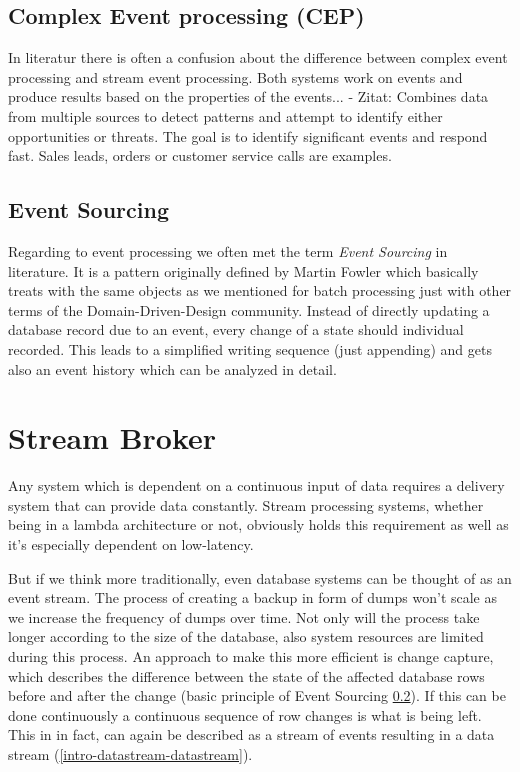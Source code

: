 \subsection{Complex Event processing (CEP)}
In literatur there is often a confusion about the difference between
complex event processing and stream event processing. Both systems work on
events and produce results based on the properties of the events... 
- Zitat: Combines data from multiple sources  to detect patterns and attempt to
identify either opportunities or threats. The goal is to identify significant
events and respond fast. Sales leads, orders or customer service calls are
examples.\\


\subsection{Event Sourcing}
\label{event-sourcing}
Regarding to event processing we often met the term \textit{Event Sourcing} in
literature. It is a pattern originally defined by Martin Fowler which basically
treats with the same objects as we mentioned for batch processing just with
other terms of the Domain-Driven-Design community. Instead of directly updating
a database record due to an event, every change of a state should individual
recorded. This leads to a simplified writing sequence (just appending) and gets
also an event history which can be analyzed in detail. 

\section{Stream Broker}
Any system which is dependent on a continuous input of data requires a delivery
system that can provide data constantly. Stream processing
systems, whether being in a lambda architecture or not, obviously holds this requirement
as well as it's especially dependent on low-latency.

But if we think more traditionally, even database systems can be thought of as
an event stream. The process of creating a backup in form of dumps won't scale as
we increase the frequency of dumps over time. Not only will the process take
longer according to the size of the database, also system resources are limited
during this process. An approach to make this more efficient is change
capture, which describes the difference between the state of the affected database
rows before and after the change (basic principle of Event Sourcing
\ref{event-sourcing}). If this can be done continuously a continuous
sequence of row changes is what is being left. This in in fact, can again
be described as a stream of events resulting in a
data stream (\ref{intro-datastream-datastream}).

